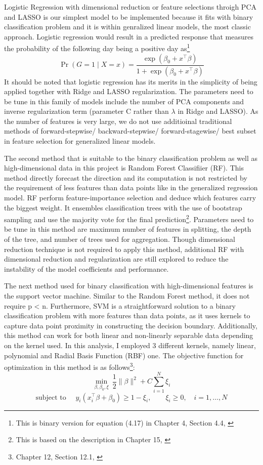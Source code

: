 \documentclass[11pt]{article}
\begin{document}
Logistic Regression with dimensional reduction or feature selections throigh PCA and LASSO is our simplest model to be implemented because it fits with binary classification problem and it is within genralized linear models, the most classic approach. Logistic regression would result in a predicted response that measures the probability of the following day being a positive day as\footnote{This is binary version for equation (4.17) in Chapter 4, Section 4.4, \cite{ESL}}
    \[
    \Pr(G=1\mid X=x)
    =
    \frac{\exp(\beta_0+x^\top\beta)}
    {1+\exp(\beta_0+x^\top\beta)}
    \] 
It should be noted that logistic regression has its merits in the simplicity of being applied together with Ridge and LASSO regularization. The parameters need to be tune in this family of models include the number of PCA components and inverse regularization term (parameter C rather than $\lambda$ in Ridge and LASSO). As the number of features is very large, we do not use additioinal traditional methods of forward-stepwise/ backward-stepwise/ forward-stagewise/ best subset in feature selection for generalized linear models. 

The second method that is suitable to the binary classification problem as well as high-dimensional data in this project is Random Forest Classifiier (RF). This method directly forecast the direction and its computation is not restricted by the requirement of less features than data points like in the generalized regression model. RF perform feature-importance selection and deduce which features carry the biggest weight. It ensembles classification trees with the use of bootstrap sampling and use the majority vote for the final prediction\footnote{This is based on the description in Chapter 15, \cite{ESL}}. Parameters need to be tune in this method are maximum number of features in splitting, the depth of the tree, and number of trees used for aggregation. Though dimensional reduction technique is not required to apply this method, additional RF with dimensional reduction and regularization are still explored to reduce the instability of the model coefficients and performance.


The next method used for binary classification with high-dimensional features is the support vector machine. Similar to the Random Forest method, it does not require p < n. Furthermore, SVM is a straightforward solution to a binary classification problem with more features than data points, as it uses kernels to capture data point proximity in constructing the decision boundary. Additionally, this method can work for both linear and non-linearly separable data depending on the kernel used. In this analysis, I employed 3 different kernels, namely linear, polynomial and Radial Basis Function (RBF) one. The objective function for optimization in this method is as follows\footnote{Chapter 12, Section 12.1, \cite{ESL}}:
    \[
    \min_{\beta,\beta_0,\xi}\ 
    \frac{1}{2}\|\beta\|^2 + C\sum_{i=1}^N \xi_i
    \]
    \[
    \text{subject to } \quad
    y_i(x_i^\top\beta+\beta_0)\ge 1-\xi_i,\qquad
    \xi_i\ge 0,\quad i=1,\dots,N
    \] 
\end{document}
